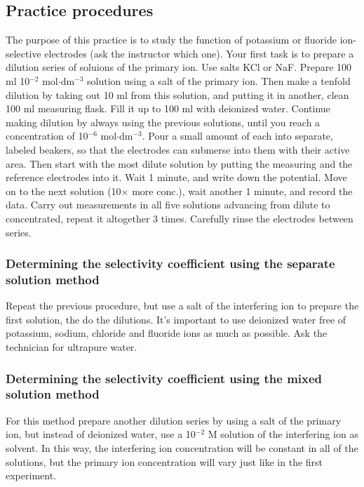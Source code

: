 \subsection{Practice procedures}
The purpose of this practice is to study the function of potassium or fluoride ion-selective electrodes (ask the instructor which one).
Your first task is to prepare a dilution series of soluions of the primary ion. Use salts KCl or NaF.
Prepare 100 ml 10$^{-2}$ mol$\cdot$dm$^{-3}$ solution using a salt of the primary ion. 
Then make a tenfold dilution by taking out 10 ml from this solution, and putting it in another, clean 100 ml measuring flask. Fill it up to 100 ml with deionized water. Continue making dilution by always using the previous solutions, until you reach a concentration of 10$^{-6}$ mol$\cdot$dm$^{-3}$. 
Pour a small amount of each into separate, labeled beakers, so that the electrodes can submerse into them with their active area.
Then start with the most dilute solution by putting the measuring and the reference electrodes into it. Wait 1 minute, and write down the potential.
Move on to the next solution (10$\times$ more conc.), wait another 1 minute, and record the data.
Carry out measurements in all five solutions advancing from dilute to concentrated, repeat it altogether 3 times. Carefully rinse the electrodes between series.

\subsubsection{Determining the selectivity coefficient using the separate solution method}
Repeat the previous procedure, but use a salt of the interfering ion to prepare the first solution, the do the dilutions. It's important to use deionized water free of potassium, sodium, chloride and fluoride ions as much as possible. Ask the technician for ultrapure water. 

\subsubsection{Determining the selectivity coefficient using the mixed solution method}
For this method prepare another dilution series by using a salt of the primary ion, but instead of deionized water, use a 10$^{-2}$ M solution of the interfering ion as solvent. In this way, the interfering ion concentration will be constant in all of the solutions, but the primary ion concentration will vary just like in the first experiment.

